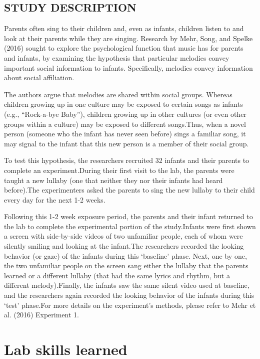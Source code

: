 \documentclass[]{book}
\theoremstyle{definition}
\theoremstyle{definition}
\theoremstyle{definition}
\theoremstyle{remark}
\begin{document}
\subsection{STUDY DESCRIPTION}\label{study-description}

Parents often sing to their children and, even as infants, children
listen to and look at their parents while they are singing. Research by
Mehr, Song, and Spelke (2016) sought to explore the psychological
function that music has for parents and infants, by examining the
hypothesis that particular melodies convey important social information
to infants. Specifically, melodies convey information about social
affiliation.

The authors argue that melodies are shared within social groups. Whereas
children growing up in one culture may be exposed to certain songs as
infants (e.g., ``Rock-a-bye Baby''), children growing up in other
cultures (or even other groups within a culture) may be exposed to
different songs.Thus, when a novel person (someone who the infant has
never seen before) sings a familiar song, it may signal to the infant
that this new person is a member of their social group.

To test this hypothesis, the researchers recruited 32 infants and their
parents to complete an experiment.During their first visit to the lab,
the parents were taught a new lullaby (one that neither they nor their
infants had heard before).The experimenters asked the parents to sing
the new lullaby to their child every day for the next 1-2 weeks.

Following this 1-2 week exposure period, the parents and their infant
returned to the lab to complete the experimental portion of the
study.Infants were first shown a screen with side-by-side videos of two
unfamiliar people, each of whom were silently smiling and looking at the
infant.The researchers recorded the looking behavior (or gaze) of the
infants during this `baseline' phase. Next, one by one, the two
unfamiliar people on the screen sang either the lullaby that the parents
learned or a different lullaby (that had the same lyrics and rhythm, but
a different melody).Finally, the infants saw the same silent video used
at baseline, and the researchers again recorded the looking behavior of
the infants during this `test' phase.For more details on the
experiment's methods, please refer to Mehr et al. (2016) Experiment 1.

\section{Lab skills learned}\label{lab-skills-learned}
\end{document}
